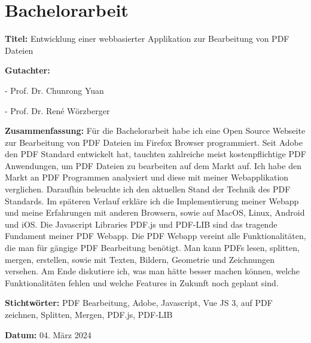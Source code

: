 \chapter*{Bachelorarbeit}
\label{chap:abstract}
%
\textbf{Titel:} Entwicklung einer webbasierter Applikation zur Bearbeitung von PDF\\ Dateien

\textbf{Gutachter:}
\par
- Prof. Dr. Chunrong Yuan
\par
- Prof. Dr. René Wörzberger

\textbf{Zusammenfassung:} Für die Bachelorarbeit habe ich eine Open Source Webseite zur Bearbeitung von PDF Dateien im Firefox Browser programmiert. Seit Adobe den PDF Standard entwickelt hat, tauchten zahlreiche meist kostenpflichtige PDF Anwendungen, um PDF Dateien zu bearbeiten auf dem Markt auf. Ich habe den Markt an PDF Programmen analysiert und diese mit meiner Webapplikation verglichen. Daraufhin beleuchte ich den aktuellen Stand der Technik des PDF Standards. Im späteren Verlauf erkläre ich die Implementierung meiner Webapp und meine Erfahrungen mit anderen Browsern, sowie auf MacOS, Linux, Android und iOS. Die Javascript Libraries PDF.js und PDF-LIB sind das tragende Fundament meiner PDF Webapp. Die PDF Webapp vereint alle Funktionalitäten, die man für gängige PDF Bearbeitung benötigt. Man kann PDFs lesen, splitten, mergen, erstellen, sowie mit Texten, Bildern, Geometrie und Zeichnungen versehen. Am Ende diskutiere ich, was man hätte besser machen können, welche Funktionalitäten fehlen und welche Features in Zukunft noch geplant sind.

\textbf{Stichtwörter:} PDF Bearbeitung, Adobe, Javascript, Vue JS 3, auf PDF zeichnen, Splitten, Mergen, PDF.js, PDF-LIB

\textbf{Datum:} 04. März 2024